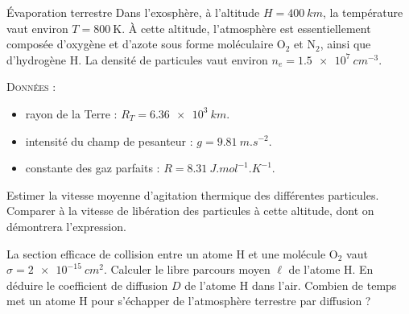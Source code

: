 \begin{exo}[PC][1][colle]{Évaporation terrestre}
  Dans l’exosphère, à l’altitude $ H = \SI{400}{km}$, la température vaut environ $T=800 \mathrm{~K}$. À cette altitude, l'atmosphère est essentiellement composée d'oxygène et d'azote sous forme moléculaire O$_2$ et N$_2$, ainsi que d'hydrogène $\mathrm{H}$. La densité de particules vaut environ $n_{e}=\SI{1,5e7}{cm^{-3}}$.

  \textsc{Données} :
  \begin{itemize}
    \item rayon de la Terre : $R_T=\SI{6,36e3}{km}$.
    \item intensité du champ de pesanteur : $g=\SI{9,81}{m.s^{-2}}$.
    \item constante des gaz parfaits : $R=\SI{8,31}{J.mol^{-1}.K^{-1}}$.
  \end{itemize}

  \begin{quest}
    \item Estimer la vitesse moyenne d’agitation thermique des différentes particules. Comparer à la vitesse de libération des particules à cette altitude, dont on démontrera l’expression.




    \item La section efficace de collision entre un atome $\mathrm{H}$ et une molécule $\mathrm{O}_2$ vaut $\sigma=\SI{2e-15}{cm^{2}}$. Calculer le libre parcours moyen $\ell$ de l'atome $\mathrm{H}$. En déduire le coefficient de diffusion $D$ de l'atome $\mathrm{H}$ dans l’air. Combien de temps met un atome $\mathrm{H}$ pour s’échapper de l’atmosphère terrestre par diffusion ?
  \end{quest}
  \end{exo}


